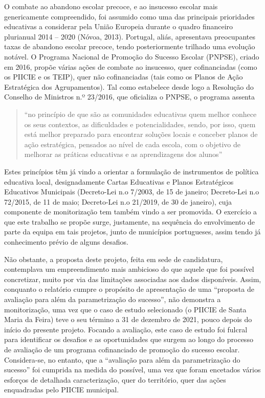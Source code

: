 \documentclass[
]{book}
\begin{document}
O combate ao abandono escolar precoce, e ao insucesso escolar mais genericamente compreendido, foi assumido como uma das principais prioridades educativas a considerar pela União Europeia durante o quadro financeiro plurianual 2014 -- 2020 (Nóvoa, 2013). Portugal, aliás, apresentava preocupantes taxas de abandono escolar precoce, tendo posteriormente trilhado uma evolução notável. O Programa Nacional de Promoção do Sucesso Escolar (PNPSE), criado em 2016, propõe várias ações de combate ao insucesso, quer cofinanciadas (como os PIICIE e os TEIP), quer não cofinanciadas (tais como os Planos de Ação Estratégica dos Agrupamentos). Tal como estabelece desde logo a Resolução do Conselho de Ministros n.º 23/2016, que oficializa o PNPSE, o programa assenta

\begin{quote}
``no princípio de que são as comunidades educativas quem melhor conhece os seus contextos, as dificuldades e potencialidades, sendo, por isso, quem está melhor preparado para encontrar soluções locais e conceber planos de ação estratégica, pensados ao nível de cada escola, com o objetivo de melhorar as práticas educativas e as aprendizagens dos alunos''
\end{quote}

Estes princípios têm já vindo a orientar a formulação de instrumentos de política educativa local, designadamente Cartas Educativas e Planos Estratégicos Educativos Municipais (Decreto-Lei n.o 7/2003, de 15 de janeiro; Decreto-Lei n.o 72/2015, de 11 de maio; Decreto-Lei n.o 21/2019, de 30 de janeiro), cuja componente de monitorização tem também vindo a ser promovida. O exercício a que este trabalho se propõe surge, justamente, na sequência do envolvimento de parte da equipa em tais projetos, junto de municípios portugueses, assim tendo já conhecimento prévio de alguns desafios.

Não obstante, a proposta deste projeto, feita em sede de candidatura, contemplava um empreendimento mais ambicioso do que aquele que foi possível concretizar, muito por via das limitações associadas aos dados disponíveis. Assim, conquanto o relatório cumpre o propósito de apresentação de uma ``proposta de avaliação para além da parametrização do sucesso'', não demonstra a monitorização, uma vez que o caso de estudo selecionado (o PIICIE de Santa Maria da Feira) teve o seu término a 31 de dezembro de 2021, pouco depois do início do presente projeto. Focando a avaliação, este caso de estudo foi fulcral para identificar os desafios e as oportunidades que surgem ao longo do processo de avaliação de um programa cofinanciado de promoção do sucesso escolar. Considera-se, no entanto, que a ``avaliação para além da parametrização do sucesso'' foi cumprida na medida do possível, uma vez que foram encetados vários esforços de detalhada caracterização, quer do território, quer das ações enquadradas pelo PIICIE municipal.
\end{document}
